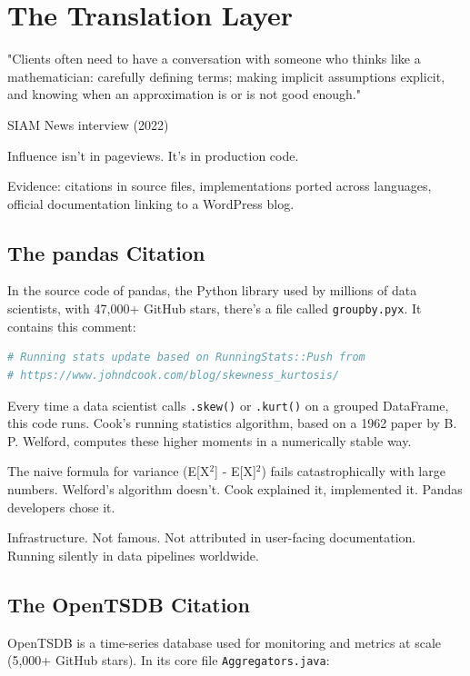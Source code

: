 \chapter{The Translation Layer}

\nopagebreak
\epigraph{"Clients often need to have a conversation with someone who thinks like a mathematician: carefully defining terms; making implicit assumptions explicit, and knowing when an approximation is or is not good enough."}{SIAM News interview (2022)}
\nopagebreak

Influence isn't in pageviews. It's in production code.

Evidence: citations in source files, implementations ported across languages, official documentation linking to a WordPress blog.

\bigskip

\section*{The pandas Citation}

In the source code of pandas, the Python library used by millions of data scientists, with 47,000+ GitHub stars, there's a file called \texttt{groupby.pyx}. It contains this comment:

\begin{lstlisting}[language=python]
# Running stats update based on RunningStats::Push from
# https://www.johndcook.com/blog/skewness_kurtosis/
\end{lstlisting}

Every time a data scientist calls \texttt{.skew()} or \texttt{.kurt()} on a grouped DataFrame, this code runs. Cook's running statistics algorithm, based on a 1962 paper by B. P. Welford, computes these higher moments in a numerically stable way.

The naive formula for variance (E[X$^2$] - E[X]$^2$) fails catastrophically with large numbers. Welford's algorithm doesn't. Cook explained it, implemented it. Pandas developers chose it.

Infrastructure. Not famous. Not attributed in user-facing documentation. Running silently in data pipelines worldwide.

\bigskip

\section*{The OpenTSDB Citation}

OpenTSDB is a time-series database used for monitoring and metrics at scale (5,000+ GitHub stars). In its core file \texttt{Aggregators.java}:

